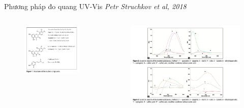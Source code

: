 \documentclass[11pt]{beamer}
\begin{document}
\begin{frame}{Phương pháp đo quang UV-Vis \tiny{ \it Petr Struchkov et al, 2018}}
	\begin{columns}[]
		\begin{figure}
			\centering
			\includegraphics[width=\textwidth]{Flavonoid UV.png}
		\end{figure}
		\begin{figure}
			\centering
			\includegraphics[width=\textwidth]{Flavonoid UV Results.png}
		\end{figure}
	\end{columns}

\end{frame}
\end{document}
